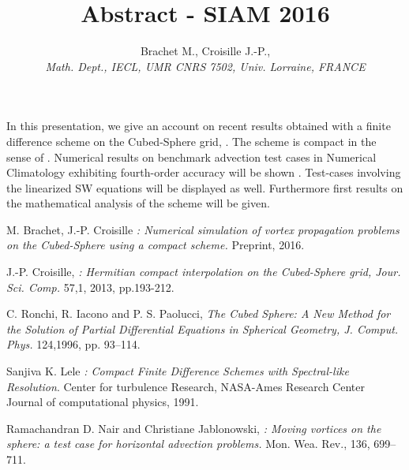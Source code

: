 \documentclass[10pt,a4paper]{article}
\author{Brachet M., Croisille J.-P., \\
\small{\sl Math. Dept., IECL, UMR CNRS 7502, Univ. Lorraine, FRANCE}}
\title{Abstract - SIAM 2016}
\begin{document}
\maketitle

In this presentation, we give an account on recent results obtained
with a finite difference scheme on the Cubed-Sphere grid, \cite{Ronchi-Iacono-Paolucci, Croisille2013}. The scheme 
is compact in the sense of \cite{Lele1991}. 
Numerical results on benchmark advection test 
cases in Numerical Climatology  \cite{Nair2008} exhibiting fourth-order accuracy  will be shown \cite{Brachet2016}.
 Test-cases involving the 
linearized SW equations will be displayed as well. Furthermore first results
on the mathematical analysis of the scheme will be given.

\begin{thebibliography}{9}

         M. Brachet, J.-P. Croisille
         \emph{:  Numerical simulation of vortex propagation problems on the Cubed-Sphere using a compact scheme.}
         Preprint,
         2016.

         J.-P. Croisille,
         \emph{: Hermitian compact interpolation on the Cubed-Sphere grid, Jour. Sci. Comp.}
          57,1,
          2013, 
		pp.193-212.

 C. Ronchi, R. Iacono and P. S. Paolucci,
\emph{The Cubed Sphere: A New Method for the Solution of Partial
Differential Equations in Spherical Geometry, J. Comput. Phys.} 124,1996, pp. 93--114.

         Sanjiva K. Lele
         \emph{:  Compact Finite Difference Schemes with Spectral-like Resolution}.
         Center for turbulence Research, NASA-Ames Research Center
         Journal of computational physics,
         1991.
         
         Ramachandran D. Nair and Christiane Jablonowski,
        \emph{:  Moving vortices on the sphere: a test case for horizontal advection problems.}
        Mon. Wea. Rev.,
        136,
        699–711.

		
\end{thebibliography}
\end{document}
